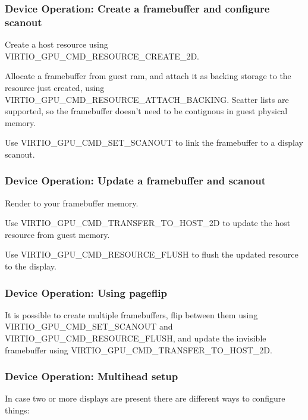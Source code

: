 \subsubsection{Device Operation: Create a framebuffer and configure scanout}

\begin{itemize*}
\item Create a host resource using VIRTIO_GPU_CMD_RESOURCE_CREATE_2D.
\item Allocate a framebuffer from guest ram, and attach it as backing
  storage to the resource just created, using
  VIRTIO_GPU_CMD_RESOURCE_ATTACH_BACKING.  Scatter lists are
  supported, so the framebuffer doesn't need to be contignous in guest
  physical memory.
\item Use VIRTIO_GPU_CMD_SET_SCANOUT to link the framebuffer to
  a display scanout.
\end{itemize*}

\subsubsection{Device Operation: Update a framebuffer and scanout}

\begin{itemize*}
\item Render to your framebuffer memory.
\item Use VIRTIO_GPU_CMD_TRANSFER_TO_HOST_2D to update the host resource
  from guest memory.
\item Use VIRTIO_GPU_CMD_RESOURCE_FLUSH to flush the updated resource
  to the display.
\end{itemize*}

\subsubsection{Device Operation: Using pageflip}

It is possible to create multiple framebuffers, flip between them
using VIRTIO_GPU_CMD_SET_SCANOUT and VIRTIO_GPU_CMD_RESOURCE_FLUSH,
and update the invisible framebuffer using
VIRTIO_GPU_CMD_TRANSFER_TO_HOST_2D.

\subsubsection{Device Operation: Multihead setup}

In case two or more displays are present there are different ways to
configure things:

